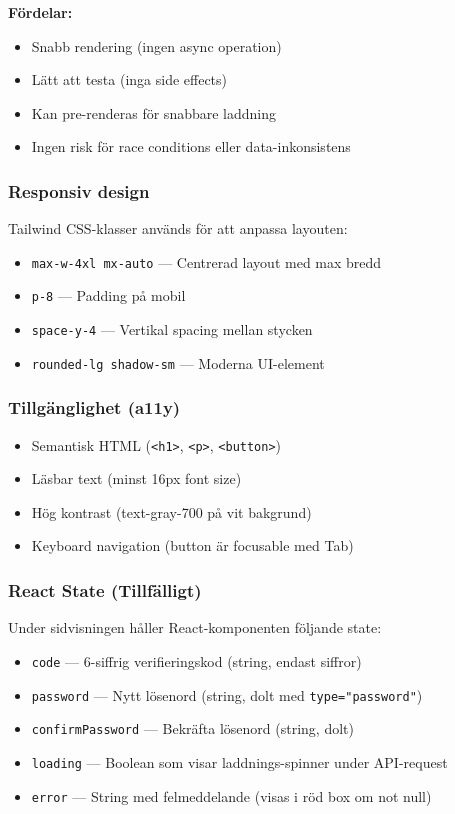 \documentclass[12pt,a4paper]{article}
\begin{document}
\textbf{Fördelar:}
\begin{itemize}[noitemsep]
  \item Snabb rendering (ingen async operation)
  \item Lätt att testa (inga side effects)
  \item Kan pre-renderas för snabbare laddning
  \item Ingen risk för race conditions eller data-inkonsistens
\end{itemize}

\subsubsection{Responsiv design}
Tailwind CSS-klasser används för att anpassa layouten:
\begin{itemize}[noitemsep]
  \item \texttt{max-w-4xl mx-auto} — Centrerad layout med max bredd
  \item \texttt{p-8} — Padding på mobil
  \item \texttt{space-y-4} — Vertikal spacing mellan stycken
  \item \texttt{rounded-lg shadow-sm} — Moderna UI-element
\end{itemize}

\subsubsection{Tillgänglighet (a11y)}
\begin{itemize}[noitemsep]
  \item Semantisk HTML (\texttt{<h1>}, \texttt{<p>}, \texttt{<button>})
  \item Läsbar text (minst 16px font size)
  \item Hög kontrast (text-gray-700 på vit bakgrund)
  \item Keyboard navigation (button är focusable med Tab)
\end{itemize}

\subsubsection{React State (Tillfälligt)}
Under sidvisningen håller React-komponenten följande state:
\begin{itemize}[noitemsep]
  \item \texttt{code} — 6-siffrig verifieringskod (string, endast siffror)
  \item \texttt{password} — Nytt lösenord (string, dolt med \texttt{type="password"})
  \item \texttt{confirmPassword} — Bekräfta lösenord (string, dolt)
  \item \texttt{loading} — Boolean som visar laddnings-spinner under API-request
  \item \texttt{error} — String med felmeddelande (visas i röd box om not null)
\end{itemize}
\end{document}
